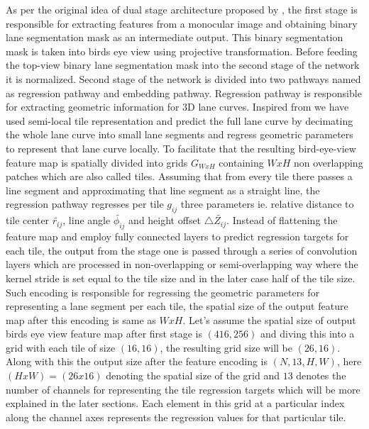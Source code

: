     As per the original idea of dual stage architecture proposed by \cite{guo2020gen}, the first stage is responsible for extracting features from a monocular image and obtaining binary lane segmentation mask as an intermediate output. This binary segmentation mask is taken into birds eye view using projective transformation. Before feeding the top-view binary lane segmentation mask into the second stage of the network it is normalized. Second stage of the network is divided into two pathways named as regression pathway and embedding pathway. Regression pathway is responsible for extracting geometric information for 3D lane curves. Inspired from \cite{DBLP:journals/corr/abs-2011-01535} we have used semi-local tile representation and predict the full lane curve by decimating the whole lane curve into small lane segments and regress geometric parameters to represent that lane curve locally. To facilitate that the resulting bird-eye-view feature map is spatially divided into grids $G_{WxH}$ containing $WxH$ non overlapping patches which are also called tiles. Assuming that from every tile there passes a line segment and approximating that line segment as a straight line, the regression pathway regresses per tile $g_{ij}$ three parameters ie. relative distance to tile center $\widetilde{r_{ij}}$, line angle $\widetilde{\phi_{ij}}$ and height offset $\triangle \widetilde{Z_{ij}}$. Instead of flattening the feature map and employ fully connected layers to predict regression targets for each tile, the output from the stage one is passed through a series of convolution layers which are processed in non-overlapping or semi-overlapping way where the kernel stride is set equal to the tile size and in the later case half of the tile size. Such encoding is responsible for regressing the geometric parameters for representing a lane segment per each tile, the spatial size of the output feature map after this encoding is same as $WxH$. Let's assume the spatial size of output birds eye view feature map after first stage is $(416,256)$ and diving this into a grid with each tile of size $(16,16)$, the resulting grid size will be $(26,16)$. Along with this the output size after the feature encoding is $(N, 13, H, W)$, here $(HxW) = (26x16)$ denoting the spatial size of the grid and $13$ denotes the number of channels for representing the tile regression targets which will be more explained in the later sections. Each element in this grid at a particular index along the channel axes represents the regression values for that particular tile.
     
